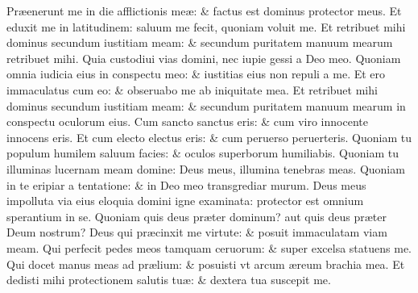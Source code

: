 \documentclass[a5paper,10pt]{book}
\def\ae{æ}
\begin{document}
\begin{multicols*}{2}
\newline \color{red} P\color{black}r\ae enerunt me in die afflictionis me\ae : \& factus est dominus protector meus.
\newline \color{red} E\color{black}t eduxit me in latitudinem: saluum me fecit, quoniam voluit me.
\newline \color{red} E\color{black}t retribuet mihi dominus secundum iustitiam meam: \& secundum puritatem manuum mearum retribuet mihi.
\newline \color{red} Q\color{black}uia custodiui vias domini, nec iupie gessi a Deo meo.
\newline \color{red} Q\color{black}uoniam omnia iudicia eius in conspectu meo: \& iustitias eius non repuli a me.
\newline \color{red} E\color{black}t ero immaculatus cum eo: \& obseruabo me ab iniquitate mea.
\newline \color{red} E\color{black}t retribuet mihi dominus secundum iustitiam meam: \& secundum puritatem manuum mearum in conspectu oculorum eius.
\newline \color{red} C\color{black}um sancto sanctus eris: \& cum viro innocente innocens eris.
\newline \color{red} E\color{black}t cum electo electus eris: \& cum peruerso peruerteris.
\newline \color{red} Q\color{black}uoniam tu populum humilem saluum facies: \& oculos superborum humiliabis.
\newline \color{red} Q\color{black}uoniam tu illuminas lucernam meam domine: Deus meus, illumina tenebras meas.
\newline \color{red} Q\color{black}uoniam in te eripiar a tentatione: \& in Deo meo transgrediar murum.
\newline \color{red} D\color{black}eus meus impolluta via eius eloquia domini igne examinata: protector est omnium sperantium in se.
\newline \color{red} Q\color{black}uoniam quis deus pr\ae ter dominum? aut quis deus pr\ae ter Deum nostrum?
\newline \color{red} D\color{black}eus qui pr\ae cinxit me virtute: \& posuit immaculatam viam meam.
\newline \color{red} Q\color{black}ui perfecit pedes meos tamquam ceruorum: \& super excelsa statuens me.
\newline \color{red} Q\color{black}ui docet manus meas ad pr\ae lium: \& posuisti vt arcum \ae reum brachia mea.
\newline \color{red} E\color{black}t dedisti mihi protectionem salutis tu\ae : \& dextera tua suscepit me.

\end{multicols*}
\end{document}
